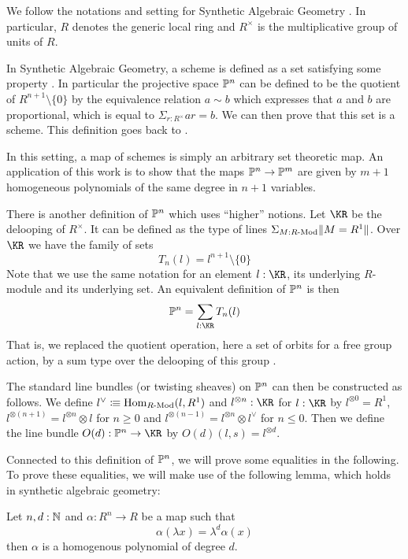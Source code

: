 We follow the notations and setting for Synthetic Algebraic Geometry \cite{draft}.
In particular, $R$ denotes the generic local ring and $R^\times$ is the multiplicative group of units of $R$.

In Synthetic Algebraic Geometry, a scheme is defined as a set satisfying some property \cite{draft}. In particular
the projective space $\mathbb{P}^n$ can be defined to be the quotient of $R^{n+1}\setminus\{0\}$ by the
equivalence relation $a\sim b$ which expresses that $a$ and $b$ are proportional, %
which is equal to $\Sigma_{r:R^\times}ar = b$. We can then prove \cite{draft}
that this set is a scheme. This definition goes back to \cite{Kock74}.

 In this setting, a map of schemes is simply an arbitrary set theoretic map. An application of this work is to show
 that the maps $\mathbb{P}^n\rightarrow \mathbb{P}^m$ are given by $m+1$ homogeneous polynomials of the same degree in $n+1$ variables.

\medskip


There is another definition of $\mathbb{P}^n$ which uses ``higher'' notions. Let $\KR$ be the delooping
of $R^\times$. It can be defined as the type of lines $\Sigma_{M:R\text{-}\mathrm{Mod}}\|{M=R^1}\|$. Over $\KR$ we have the
family of sets
$$T_n(l) = l^{n+1}\setminus\{0\}$$
Note that we use the same notation for an element $l : \KR$,
its underlying $R$-module and its underlying set.
An equivalent definition of $\mathbb{P}^n$ is then
$$
\bP^n = \sum_{l:\KR}T_n(l)
$$
That is, we replaced the quotient operation, here a set of orbits for a free group action, by a sum type over the delooping of this group
\cite{Sym}.

The standard line bundles (or twisting sheaves) on $\mathbb{P}^n$ can then be constructed as follows.
We define $l^{\vee}\vcentcolon\mspace{-1.2mu}\equiv \mathrm{Hom}_{R\text{-}\mathrm{Mod}}(l,R^1)$
and $l^{\otimes n}:\KR$ for $l:\KR$ by
$l^{\otimes 0} = R^1$,
$l^{\otimes (n+1)} = l^{\otimes n}\otimes l$ for $n \geqslant 0$
and $l^{\otimes (n-1)} = l^{\otimes n}\otimes l^{\vee}$ for $n \leqslant 0$.
Then we define the line bundle $O(d):\bP^n\rightarrow \KR$ by $O(d)(l,s) = l^{\otimes d}$.

\medskip

 Connected to this definition of $\mathbb{P}^n$, we will prove some equalities in the following.
 To prove these equalities, we will make use of the following lemma, which holds in synthetic algebraic geometry:
 
\begin{lemma}\label{invariant-implies-homogenous}
  Let $n,d:\mathbb{N}$ and $\alpha:R^n\to R$ be a map such that
  \[\alpha(\lambda x)=\lambda^d\alpha(x)\]
  then $\alpha$ is a homogenous polynomial of degree $d$.
\end{lemma}

